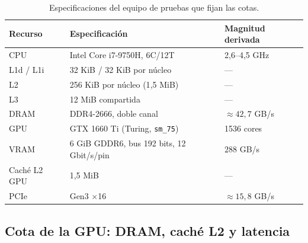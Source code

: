 \documentclass[
	spanish,
	letterpaper, oneside
]{article}
\begin{document}
\begin{table}[H]
	\centering
	\caption{Especificaciones del equipo de pruebas que fijan las cotas.}
	\label{tab:hw}
	\begin{tabular}{@{}lll@{}}
		\toprule
		Recurso & Especificación & Magnitud derivada \\
		\midrule
		CPU          & Intel Core i7-9750H, 6C/12T          & 2{,}6--4{,}5 GHz \\
		L1d / L1i    & 32 KiB / 32 KiB por núcleo           & --- \\
		L2           & 256 KiB por núcleo (1{,}5 MiB)       & --- \\
		L3           & 12 MiB compartida                    & --- \\
		DRAM         & DDR4-2666, doble canal               & $\approx 42{,}7$ GB/s \\
		GPU          & GTX 1660 Ti (Turing, \texttt{sm\_75}) & 1536 cores \\
		VRAM         & 6 GiB GDDR6, bus 192 bits, 12 Gbit/s/pin & $288$ GB/s \\
		Caché L2 GPU & 1{,}5 MiB                             & --- \\
		PCIe         & Gen3 $\times$16                      & $\approx 15{,}8$ GB/s \\
		\bottomrule
	\end{tabular}
\end{table}

\subsection{Cota de la GPU: DRAM, caché L2 y latencia}
\label{sec:cota-gpu}
\end{document}
